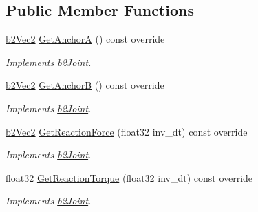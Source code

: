 \subsection*{Public Member Functions}
\begin{DoxyCompactItemize}
\item 
\mbox{\label{classb2MouseJoint_a3c42531ac763bca3658a987d0ac7d2c4}} 
\mbox{\hyperlink{structb2Vec2}{b2\+Vec2}} \mbox{\hyperlink{classb2MouseJoint_a3c42531ac763bca3658a987d0ac7d2c4}{Get\+AnchorA}} () const override
\begin{DoxyCompactList}\small\item\em Implements \mbox{\hyperlink{classb2Joint}{b2\+Joint}}. \end{DoxyCompactList}\item 
\mbox{\label{classb2MouseJoint_adecfaff123ba199f9fc80be7fcb74af2}} 
\mbox{\hyperlink{structb2Vec2}{b2\+Vec2}} \mbox{\hyperlink{classb2MouseJoint_adecfaff123ba199f9fc80be7fcb74af2}{Get\+AnchorB}} () const override
\begin{DoxyCompactList}\small\item\em Implements \mbox{\hyperlink{classb2Joint}{b2\+Joint}}. \end{DoxyCompactList}\item 
\mbox{\label{classb2MouseJoint_a1af7bb9f41076b29a1ddefd7b6c2f27b}} 
\mbox{\hyperlink{structb2Vec2}{b2\+Vec2}} \mbox{\hyperlink{classb2MouseJoint_a1af7bb9f41076b29a1ddefd7b6c2f27b}{Get\+Reaction\+Force}} (float32 inv\+\_\+dt) const override
\begin{DoxyCompactList}\small\item\em Implements \mbox{\hyperlink{classb2Joint}{b2\+Joint}}. \end{DoxyCompactList}\item 
\mbox{\label{classb2MouseJoint_aa9ea0d1b1aa2db5be3ed63392a7e28a2}} 
float32 \mbox{\hyperlink{classb2MouseJoint_aa9ea0d1b1aa2db5be3ed63392a7e28a2}{Get\+Reaction\+Torque}} (float32 inv\+\_\+dt) const override
\begin{DoxyCompactList}\small\item\em Implements \mbox{\hyperlink{classb2Joint}{b2\+Joint}}. \end{DoxyCompactList}\item 
\mbox{\label{classb2MouseJoint_a96f34c1c990407eddbadf07ae359b1f3}} 

\end{DoxyCompactItemize}
